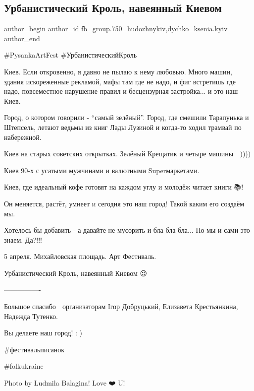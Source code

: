  
 
 
 
 

\subsection{Урбанистический Кроль, навеянный Киевом}
\label{sec:02_04_2018.fb.fb_group.750_hudozhnykiv.3.urbanisticheskij_krol_navejannyj_kievom}
 
\ifcmt
 author_begin
   author_id fb_group.750_hudozhnykiv,dychko_ksenia.kyiv
 author_end
\fi

\#PysankaArtFest \#УрбанистическийКроль

Киев. Если откровенно, я давно не пылаю к нему любовью. Много машин, здания
искореженные рекламой, мафы там где не надо, и фиг встретишь где надо,
повсеместное нарушение правил и бесцензурная застройка... и это наш Киев. 

Город, о котором говорили - \enquote{самый зелёный}. Город, где смешили Тарапунька и
Штепсель, летают ведьмы из книг Лады Лузиной и когда-то ходил трамвай по
набережной. 

Киев на старых советских открытках. Зелёный Крещатик и четыре машины 🚗 ))))

Киев 90-х с усатыми мужчинами и валютными Superмаркетами. 

Киев, где идеальный кофе готовят на каждом углу и молодёж читает книги 📚! 

Он меняется, растёт, умнеет и сегодня это наш город! Такой каким его создаём
мы. 

Хотелось бы добавить - а давайте не мусорить и бла бла бла... Но мы и сами это
знаем. Да?!!!

5 апреля.  Михайловская площадь. Арт Фестиваль. 

Урбанистический Кроль, навеянный Киевом 😉 

—————-

Большое спасибо 🙏 организаторам Ігор Добруцький, Елизавета Крестьянкина,
Надежда Тутенко.

Вы делаете наш город! : )

\#фестивальписанок

\#folkukraine

Photo by Ludmila Balagina! Love ❤️ U!

